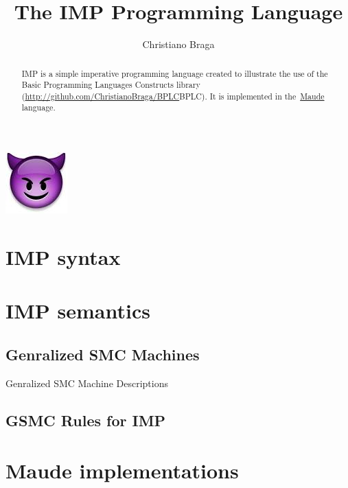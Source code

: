 \documentclass{llncs}%
\begin{document}
\title{The IMP Programming Language}
\author{Christiano Braga\\}

\maketitle

\begin{center} \includegraphics[scale=0.45]{img/imp.jpg}\end{center}

\begin{abstract}
IMP is a simple imperative programming language created to illustrate the use of the Basic Programming Languages Constructs library (\url{http://github.com/ChristianoBraga/BPLC}{BPLC}). It is implemented in the~\href{http://maude.cs.uiuc.edu}{Maude} language.
\end{abstract}

\pagestyle{plain}

\section{IMP syntax}

\section{IMP semantics}

\subsection{Genralized SMC Machines}

Genralized SMC Machine Descriptions

\subsection{GSMC Rules for IMP}

\section{Maude implementations}
\end{document}
